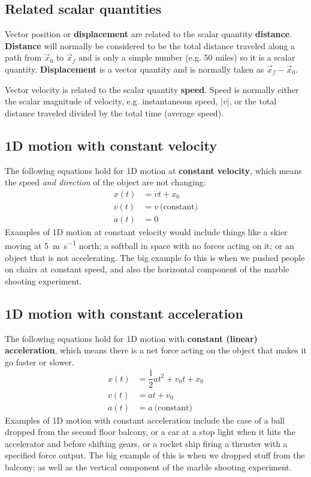 \documentclass[handout]{tufte-handout}
\begin{document}
\subsection{Related scalar quantities}
Vector position or \textbf{displacement} are related to the scalar quantity \textbf{distance}.  \textbf{Distance} will normally be considered to be the total distance traveled along a path from $\vec{x}_0$ to $\vec{x}_f$ and is only a simple number (e.g. 50 miles) so it is a scalar quantity.  \textbf{Displacement} is a vector quantity and is normally taken as $\vec{x}_f - \vec{x}_0$. 

Vector velocity is related to the scalar quantity \textbf{speed}. Speed is normally either the scalar magnitude of velocity, e.g. instantaneous speed, $|v|$, or the total distance traveled divided by the total time (average speed). 

\subsection{1D motion with constant velocity}
The following equations hold for 1D motion at \textbf{constant velocity}, which means the speed \emph{and direction} of the object are not changing:
\begin{align}
x(t) &= v t + x_0 \\
v(t) &= v\ \text{(constant)} \\
a(t) &= 0
\end{align}
Examples of 1D motion at constant velocity would include things like a skier moving at \SI{5}{\meter\per\second} north; a softball in space with no forces acting on it; or an object that is not accelerating. The big example fo this is when we pushed people on chairs at constant speed, and also the horizontal component of the marble shooting experiment. 

\subsection{1D motion with constant acceleration}
The following equations hold for 1D motion with \textbf{constant (linear) acceleration}, which means there is a net force acting on the object that makes it go faster or slower. 
\begin{align}
x(t) &= \dfrac{1}{2} a t^2 + v_0 t + x_0 \\
v(t) &= at + v_0 \\
a(t) &= a\ \text{(constant)} 
\end{align}
Examples of 1D motion with constant acceleration include the case of a ball dropped from the second floor balcony, or a car at a stop light when it hits the accelerator and before shifting gears, or a rocket ship firing a thruster with a specified force output. The big example of this is when we dropped stuff from the balcony; as well as the vertical component of the marble shooting experiment. 
\end{document}
